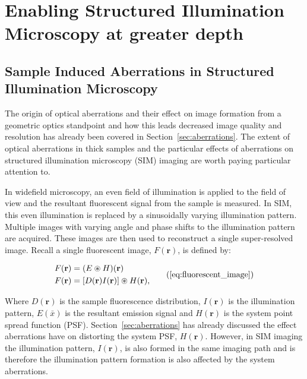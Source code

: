 \chapter{Enabling Structured Illumination Microscopy at greater depth}

\section{Sample Induced Aberrations in Structured Illumination Microscopy}
\label{sec:sample_aberrations_SIM}

The origin of optical aberrations and their effect on image
formation from a geometric optics standpoint and how this leads 
decreased image quality and resolution has already been covered 
in Section~\ref{sec:aberrations}. The extent of optical 
aberrations in thick samples and the particular effects of
aberrations on structured illumination microscopy (SIM) imaging 
are worth paying particular attention to. 

In widefield microscopy, an even field of illumination is 
applied to the field of view and the resultant fluorescent
signal from the sample is measured. In SIM, this even 
illumination is replaced by a sinusoidally varying
illumination pattern. Multiple images with varying angle 
and phase shifts to the illumination pattern are acquired. 
These images are then used to reconstruct a single 
super-resolved image.\cite{gustafsson2000surpassing,gustafsson2008three}
Recall a single fluorescent image, $F(\textbf{r})$, is 
defined by:

\begin{equation}
\begin{split}
F(\textbf{r}) &= (E \circledast H)(\textbf{r})\\
F(\textbf{r}) &= [D(\textbf{r})I(\textbf{r})] \circledast H(\textbf{r}),\\
\end{split}\tag{\ref{eq:fluorescent_image}}
\end{equation}

Where $D(\textbf{r})$ is the sample fluorescence distribution, 
$I(\textbf{r})$ is the illumination pattern, $E(\bar{x})$ is
the resultant emission signal and $H(\textbf{r})$ is the system 
point spread function (PSF). Section~\ref{sec:aberrations} has already
discussed the effect aberrations have on distorting the system
PSF, $H(\textbf{r})$. However, in SIM imaging the illumination 
pattern, $I(\textbf{r})$, is also formed in the same imaging path
and is therefore the illumination pattern formation is also 
affected by the system aberrations.

